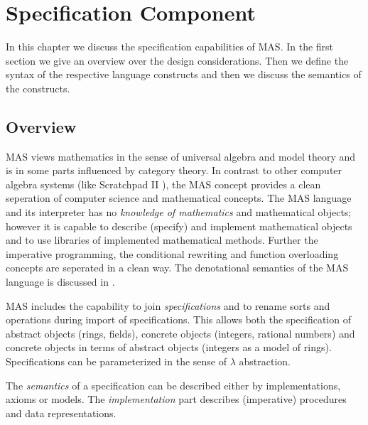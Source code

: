 

\chapter{Specification Component}

\label{spec.chap}
In this chapter we discuss the 
specification capabilities of MAS. In the first section we 
give an overview over the design considerations. 
Then we define the syntax of the respective language 
constructs and then we discuss the semantics of the 
constructs. 

\section{Overview} %

MAS views mathematics in the 
sense of universal algebra and model theory and is 
in some parts influenced by category theory.
In contrast to other computer algebra systems
(like Scratchpad II \cite{Jenks 85}),
the MAS concept provides a clean seperation of 
computer science and mathematical concepts. 
The MAS language and its interpreter has no 
{\em knowledge of mathematics} and mathematical objects; 
however it is capable to describe (specify) and implement 
mathematical objects and to 
use libraries of implemented mathematical methods. 
Further the imperative programming, the conditional rewriting 
and function overloading concepts are seperated in a clean way.
The denotational semantics of the MAS language is 
discussed in \cite{Kredel 91}.

MAS includes the capability to 
join {\em specifications} and to rename sorts and operations 
during import of specifications. 
This allows both the specification of abstract objects 
(rings, fields),
concrete objects (integers, rational numbers) and 
concrete objects in terms of abstract objects 
(integers as a model of rings). 
Specifications can be parameterized in the sense of 
$\lambda$ abstraction.

The {\em semantics} of a specification can be 
described either by implementations, axioms or models.
The {\em implementation} part describes 
(imperative) procedures and data representations.   

